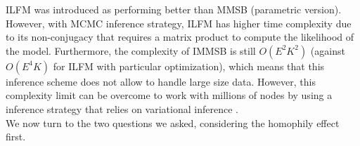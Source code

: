 ILFM was introduced as performing better than MMSB (parametric version). However, with MCMC inference strategy, ILFM has higher time complexity due to its non-conjugacy that requires a matrix product to compute the likelihood of the model. Furthermore, the complexity of IMMSB is still $O(E^2K^2)$ (against $O(E^4K)$ for ILFM with particular optimization), which means that this inference scheme  does not allow to handle large size data. However, this complexity limit can be overcome  to work with millions of nodes by using a inference strategy that relies on variational inference \cite{gopalan2013efficient}.\\

 We now turn to the two questions we asked, considering the homophily effect first.
